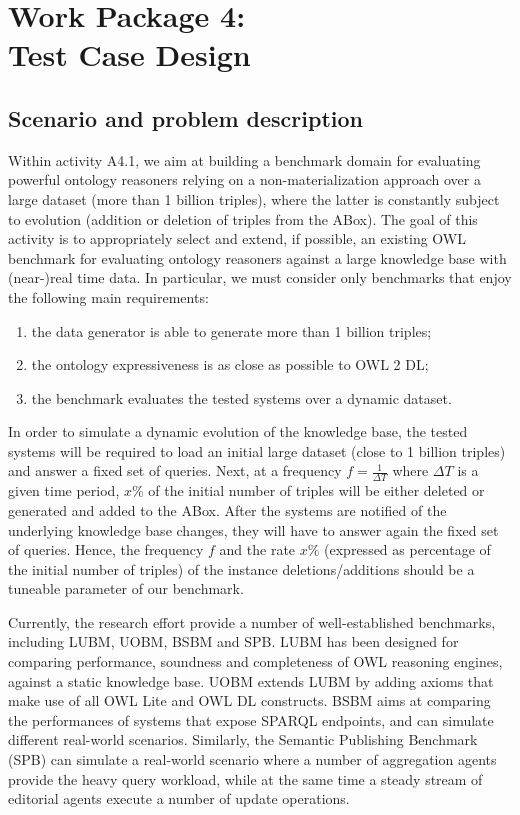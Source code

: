 \documentclass[oneside]{book}
\begin{document}
\part*{Work Package 4:\\Test Case Design}

\chapter{Scenario and problem description}

Within activity A4.1, we aim at building a benchmark domain for evaluating powerful ontology reasoners relying on a non-materialization approach over a large dataset (more than 1 billion triples), where the latter is constantly subject to evolution (addition or deletion of triples from the ABox). The goal of this activity is to appropriately select and extend, if possible, an existing OWL benchmark for evaluating ontology reasoners against a large knowledge base with (near-)real time data. In particular, we must consider only benchmarks that enjoy the following main requirements:
\begin{enumerate}
\item the data generator is able to generate more than 1 billion triples;
\item the ontology expressiveness is as close as possible to OWL 2 DL;
\item the benchmark evaluates the tested systems over a dynamic dataset. 
\end{enumerate}
In order to simulate a dynamic evolution of the knowledge base, the tested systems will be required to load an initial large dataset (close to 1 billion triples) and answer a fixed set of queries. Next, at a frequency $f=\frac{1}{\Delta T}$ where $\Delta T$ is a given time period,  $x\%$ of the initial number of triples will be either deleted or generated and added to the ABox. After the systems are notified of the underlying knowledge base changes, they will have to answer again the fixed set of queries. Hence, the frequency $f$ and the rate $x\%$ (expressed as percentage of the initial number of triples) of the instance deletions/additions should be a tuneable parameter of our benchmark. 

Currently, the research effort provide a number of well-established benchmarks, including LUBM, UOBM, BSBM and SPB. LUBM has been designed for comparing performance, soundness and completeness of OWL reasoning engines, against a static knowledge base. UOBM extends LUBM by adding axioms that make use of all OWL Lite and OWL DL constructs. BSBM aims at comparing the performances of systems that expose SPARQL endpoints, and can simulate different real-world scenarios. Similarly, the Semantic Publishing Benchmark (SPB) can simulate a real-world scenario where a number of aggregation agents provide the heavy query workload, while at the same time a steady stream of editorial agents execute a number of update operations.
\end{document}
